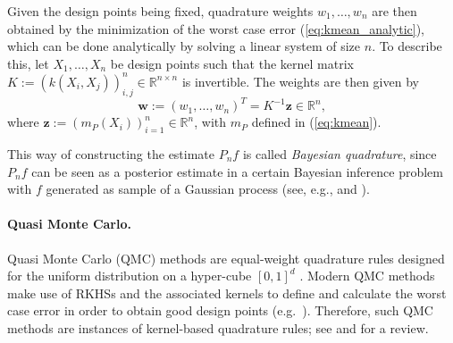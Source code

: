 \documentclass[11pt]{article}
\theoremstyle{remark}
\theoremstyle{example}
\theoremstyle{remark}
\newcommand{\R}{\mathbb{R}}
\newcommand{\citep}{\cite}
\newcommand{\citealp}{\cite}
\begin{document}
Given the design points being fixed,  quadrature weights $w_1,\dots,w_n$ are then obtained by the minimization of the worst case error (\ref{eq:kmean_analytic}),
which can be done analytically by solving a linear system of size $n$.
To describe this, let $X_1,\dots,X_n$ be design points such that the kernel matrix $K := (k(X_i,X_j))_{i,j}^n \in \R^{n \times n}$ is invertible. 
The weights are then given by 
\begin{equation} \label{eq:BQ_weight}
{\bm w} := (w_1,\dots,w_n)^T = K^{-1} {\bm z} \in \R^n,
\end{equation}
where  ${\bm z} := ( m_P(X_i) )_{i=1}^n \in \R^n$, with $m_P$ defined in (\ref{eq:kmean}).



This way of constructing the estimate $P_n f$ is called {\em Bayesian quadrature}, since $P_n f$ can be seen as a posterior estimate in a certain Bayesian inference problem with $f$ generated as sample of a Gaussian process (see, e.g., \cite{HusDuv12} and \cite{BriOatGirOsbSej15}).\vspace{-3mm}


\begin{comment}
Note that, in the Bayesian view, the ``randomness'' of the integrand $f$ is caused by the fact the a computer can only know the shape of $f$ after evaluating its function values: this is so-called the {\em epistemic uncertainty}.
Thus the randomness occurs even when $f$ is a deterministic function (i.e., even when there is no noise in the output).
Dealing with such epistemic uncertainty arising in numerical analysis via Gaussian process (or more generally stochastic processes) is the focus of the recently emerging field of {\em Probabilistic Numerics}: for interested readers, we refer to \cite{HenOsbGirRSPA2015} for a recent review.
\end{comment}


\paragraph{Quasi Monte Carlo.}
Quasi Monte Carlo (QMC) methods are equal-weight quadrature rules designed for the uniform distribution on a hyper-cube $[0,1]^d$ \citep{DicKuoSlo13}.
Modern QMC methods make use of RKHSs and the associated kernels to define and calculate the worst case error in order to obtain good design points (e.g.~\citealp{Hic98,SloWoz98,Dic07,DicNuyPil14}).
Therefore, such QMC methods are instances of kernel-based quadrature rules; see \cite{NovWoz10} and \cite{DicKuoSlo13} for a review.\vspace{-3mm}
\end{document}
